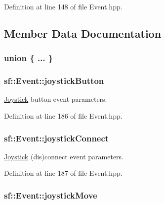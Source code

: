 Definition at line 148 of file Event.\-hpp.



\subsection{Member Data Documentation}
\hypertarget{classsf_1_1_event_a2bf14023ff24b0ae4d3a3fb263a31845}{\subsubsection[{"@7}]{\setlength{\rightskip}{0pt plus 5cm}union \{ ... \} }}\label{classsf_1_1_event_a2bf14023ff24b0ae4d3a3fb263a31845}
\hypertarget{classsf_1_1_event_a42aad27a054c1c05bd5c3d020e1db174}{
\subsubsection[{joystick\-Button}]{ sf\-::\-Event\-::joystick\-Button}}\label{classsf_1_1_event_a42aad27a054c1c05bd5c3d020e1db174}


\hyperlink{classsf_1_1_joystick}{Joystick} button event parameters. 



Definition at line 186 of file Event.\-hpp.

\hypertarget{classsf_1_1_event_aa354335c9ad73362442bc54ffe81118f}{
\subsubsection[{joystick\-Connect}]{ sf\-::\-Event\-::joystick\-Connect}}\label{classsf_1_1_event_aa354335c9ad73362442bc54ffe81118f}


\hyperlink{classsf_1_1_joystick}{Joystick} (dis)connect event parameters. 



Definition at line 187 of file Event.\-hpp.

\hypertarget{classsf_1_1_event_ac479e8351cc2024d5c1094dc33970f7f}{
\subsubsection[{joystick\-Move}]{ sf\-::\-Event\-::joystick\-Move}}\label{classsf_1_1_event_ac479e8351cc2024d5c1094dc33970f7f}


